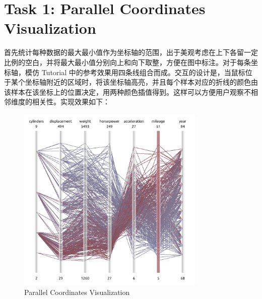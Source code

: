 \documentclass[UTF8]{ctexart}
\begin{document}
\section*{Task 1: Parallel Coordinates Visualization}

首先统计每种数据的最大最小值作为坐标轴的范围，出于美观考虑在上下各留一定比例的空白，并将最大最小值分别向上和向下取整，方便在图中标注。对于每条坐标轴，模仿 Tutorial 中的参考效果用四条线组合而成。交互的设计是，当鼠标位于某个坐标轴附近的区域时，将该坐标轴高亮，并且每个样本对应的折线的颜色由该样本在该坐标上的位置决定，用两种颜色插值得到。这样可以方便用户观察不相邻维度的相关性。实现效果如下：

\begin{figure}[htbp]
    \centering
    \includegraphics[width=0.8\textwidth]{images/vis.png}
    \caption*{Parallel Coordinates Visualization}
\end{figure}
\end{document}
